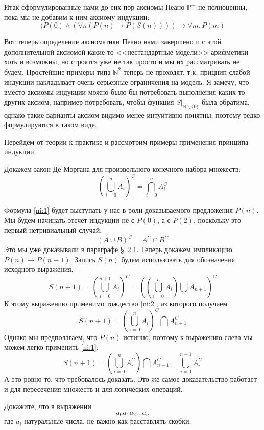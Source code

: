 Итак сформулированные нами до сих пор аксиомы Пеано $\mathbb{P}^-$ не полноценны, пока мы не добавим к ним аксиому индукции:
$$(P(0)\land(\forall n (P(n)\to P(S(n)))) \to \forall m, P(m)$$

Вот теперь определение аксиоматики Пеано нами завершено и с этой дополнительной аксиомой какие-то <<нестандартные модели>> арифметики хоть и возможны, но строятся уже не так просто и мы их рассматривать не будем. Простейшие примеры типа $\mathbb{N}^2$ теперь не проходят, т.к. прицнип слабой индукции накладывает очень серьезные ограничения на модель. Я замечу, что вместо аксиомы индукции можно было бы потребовать выполнения каких-то других аксиом, например потребовать, чтобы функция $S|_{\mathbb{N}\backslash\{0\}}$ была обратима, однако такие варианты аксиом видимо менее интуитивно понятны, поэтому редко формулируются в таком виде.

Перейдём от теории к практике и рассмотрим примеры применения принципа индукции.

\begin{example}
Докажем закон Де Моргана для произвольного конечного набора множеств:
\begin{equation}\label{ni:1}
\left(\bigcup_{i=0}^n A_i\right)^C = \bigcap_{i=0}^n A_i^C
\end{equation}
\end{example}

Формула \eqref{ni:1} будет выступать у нас в роли доказываемого предложения $P(n)$. Мы будем начинать отсчёт индукции не с $P(0)$, а с $P(2)$, поскольку это первый нетривиальный случай:
\begin{equation}\label{ni:2}
(A\cup B)^C = A^C \cap B^C
\end{equation}
Это мы уже доказывали в параграфе \S~2.1. Теперь докажем импликацию $P(n)\to P(n + 1)$. Запись $S(n)$ будем использовать для обозначения исходного выражения.
$$S(n+1) = \left( \bigcup_{i=0}^{n+1} A_i \right)^C = \left( \left( \bigcup_{i=0}^n A_i\right) \bigcup A_{n+1}\right)^C$$
К этому выражению применимо тождество \eqref{ni:2}, из которого получаем
$$S(n+1) = \left( \bigcup_{i=0}^n A_i\right)^C \bigcap A_{n+1}^C$$
Однако мы предполагаем, что $P(n)$ истинно, поэтому к выражению слева мы можем легко применить \eqref{ni:1}:
$$S(n+1) = \left(\bigcup_{i=0}^n A_i^C\right) \bigcap A_{n+1}^C = \bigcup_{i=0}^{n+1} A_i^C$$
А это ровно то, что требовалось доказать. Это же самое доказательство работает и для пересечения множеств и для логических операций.

\begin{example}\label{ex:naturals_assoc}
Докажите, что в выражении
$$a_0 a_1 a_2 \ldots a_n$$
где $a_i$ натуральные числа, не важно как расставлять скобки.
\end{example}

